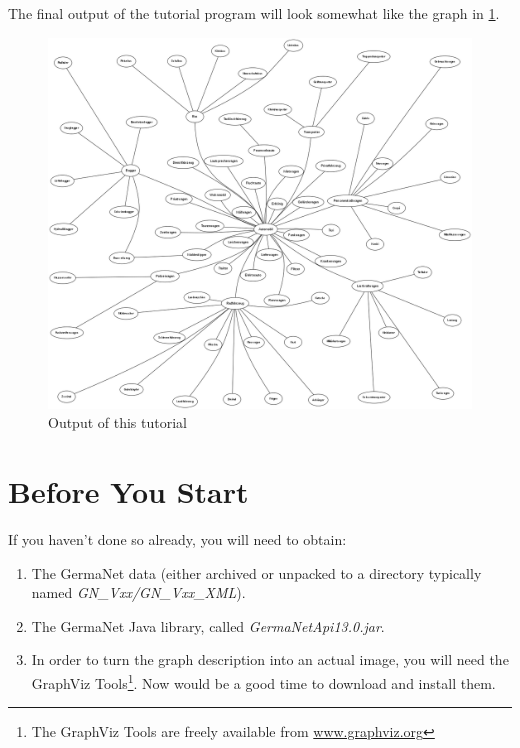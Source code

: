 \documentclass[12pt,a4paper,english,utf8]{report}
\begin{document}
The final output of the tutorial program will look somewhat like the graph in \ref{autograph}.

\begin{figure}[htb] 
	\begin{center}
		\includegraphics[scale=0.3]{auto_graph.png}
	\end{center}
	\caption{Output of this tutorial}
	\label{autograph}
\end{figure}

\section{Before You Start}
\label{tutorialStarts}
If you haven't done so already, you will need to obtain:

\renewcommand{\labelenumi}{\arabic{enumi}}
\begin{enumerate}
	\item The GermaNet data (either archived or unpacked to a directory typically named \emph{GN\_Vxx/GN\_Vxx\_XML}).
	\item The GermaNet Java library, called \emph{GermaNetApi13.0.jar}.
	\item In order to turn the graph description into an actual image, you will need the GraphViz Tools\footnote{The GraphViz Tools are freely available from \href{www.graphviz.org}{www.graphviz.org}}. Now would be a good time to download and install them.
\end{enumerate}
\end{document}
